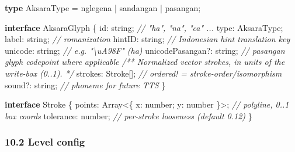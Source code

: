 \documentclass[
  11pt,
]{article}
\newenvironment{Shaded}{}{}
\newcommand{\BuiltInTok}[1]{\textcolor[rgb]{0.00,0.50,0.00}{#1}}
\newcommand{\CommentTok}[1]{\textcolor[rgb]{0.38,0.63,0.69}{\textit{#1}}}
\newcommand{\DataTypeTok}[1]{\textcolor[rgb]{0.56,0.13,0.00}{#1}}
\newcommand{\KeywordTok}[1]{\textcolor[rgb]{0.00,0.44,0.13}{\textbf{#1}}}
\newcommand{\NormalTok}[1]{#1}
\newcommand{\OperatorTok}[1]{\textcolor[rgb]{0.40,0.40,0.40}{#1}}
\newcommand{\StringTok}[1]{\textcolor[rgb]{0.25,0.44,0.63}{#1}}
\begin{document}
\begin{Shaded}
\begin{Highlighting}[]
\KeywordTok{type}\NormalTok{ AksaraType }\OperatorTok{=} \StringTok{\textquotesingle{}nglegena\textquotesingle{}} \OperatorTok{|} \StringTok{\textquotesingle{}sandangan\textquotesingle{}} \OperatorTok{|} \StringTok{\textquotesingle{}pasangan\textquotesingle{}}\OperatorTok{;}

\KeywordTok{interface}\NormalTok{ AksaraGlyph \{}
\NormalTok{  id}\OperatorTok{:} \DataTypeTok{string}\OperatorTok{;}                    \CommentTok{// "ha", "na", "ca" ...}
\NormalTok{  type}\OperatorTok{:}\NormalTok{ AksaraType}\OperatorTok{;}
\NormalTok{  label}\OperatorTok{:} \DataTypeTok{string}\OperatorTok{;}                 \CommentTok{// romanization}
\NormalTok{  hintID}\OperatorTok{:} \DataTypeTok{string}\OperatorTok{;}                \CommentTok{// Indonesian hint translation key}
\NormalTok{  unicode}\OperatorTok{:} \DataTypeTok{string}\OperatorTok{;}               \CommentTok{// e.g. "\textbackslash{}uA98F" (ha)}
\NormalTok{  unicodePasangan}\OperatorTok{?:} \DataTypeTok{string}\OperatorTok{;}      \CommentTok{// pasangan glyph codepoint where applicable}
  \CommentTok{/** Normalized vector strokes, in units of the write{-}box (0..1). */}
\NormalTok{  strokes}\OperatorTok{:}\NormalTok{ Stroke[]}\OperatorTok{;}             \CommentTok{// ordered! = stroke{-}order/isomorphism}
\NormalTok{  sound}\OperatorTok{?:} \DataTypeTok{string}\OperatorTok{;}                \CommentTok{// phoneme for future TTS}
\NormalTok{\}}

\KeywordTok{interface}\NormalTok{ Stroke \{}
\NormalTok{  points}\OperatorTok{:} \BuiltInTok{Array}\OperatorTok{\textless{}}\NormalTok{\{ x}\OperatorTok{:} \DataTypeTok{number}\OperatorTok{;}\NormalTok{ y}\OperatorTok{:} \DataTypeTok{number}\NormalTok{ \}}\OperatorTok{\textgreater{};}  \CommentTok{// polyline, 0..1 box coords}
\NormalTok{  tolerance}\OperatorTok{:} \DataTypeTok{number}\OperatorTok{;}                         \CommentTok{// per{-}stroke looseness (default 0.12)}
\NormalTok{\}}
\end{Highlighting}
\end{Shaded}

\subsubsection{10.2 Level config}\label{level-config}
\end{document}
